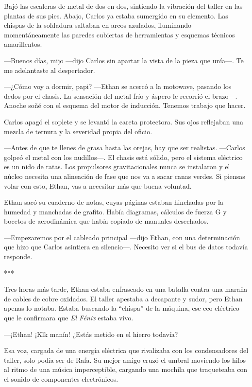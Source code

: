 \documentclass[11pt,twoside]{book}
\begin{document}
Bajó las escaleras de metal de dos en dos, sintiendo la vibración del taller en las plantas de sus pies. Abajo, Carlos ya estaba sumergido en su elemento. Las chispas de la soldadura saltaban en arcos azulados, iluminando momentáneamente las paredes cubiertas de herramientas y esquemas técnicos amarillentos.

---Buenos días, mijo ---dijo Carlos sin apartar la vista de la pieza que unía---. Te me adelantaste al despertador.

---¿Cómo voy a dormir, papi? ---Ethan se acercó a la motowave, pasando los dedos por el chasis. La sensación del metal frío y áspero le recorrió el brazo---. Anoche soñé con el esquema del motor de inducción. Tenemos trabajo que hacer.

Carlos apagó el soplete y se levantó la careta protectora. Sus ojos reflejaban una mezcla de ternura y la severidad propia del oficio.

---Antes de que te llenes de grasa hasta las orejas, hay que ser realistas. ---Carlos golpeó el metal con los nudillos---. El chasis está sólido, pero el sistema eléctrico es un nido de ratas. Los propulsores gravitacionales nunca se instalaron y el núcleo necesita una alineación de fase que nos va a sacar canas verdes. Si piensas volar con esto, Ethan, vas a necesitar más que buena voluntad.

Ethan sacó su cuaderno de notas, cuyas páginas estaban hinchadas por la humedad y manchadas de grafito. Había diagramas, cálculos de fuerza G y bocetos de aerodinámica que había copiado de manuales desechados.

---Empezaremos por el cableado principal ---dijo Ethan, con una determinación que hizo que Carlos asintiera en silencio---. Necesito ver si el bus de datos todavía responde.

\bigskip
\begin{center}***\end{center}
\bigskip

Tres horas más tarde, Ethan estaba enfrascado en una batalla contra una maraña de cables de cobre oxidados. El taller apestaba a decapante y sudor, pero Ethan apenas lo notaba. Estaba buscando la ``chispa'' de la máquina, ese eco eléctrico que le confirmara que \textit{El Fénix} estaba vivo.

---¡Ethan! ¡Klk manín! ¿Estás metido en el hierro todavía?

Esa voz, cargada de una energía eléctrica que rivalizaba con los condensadores del taller, solo podía ser de Rafa. Su mejor amigo cruzó el umbral moviendo los hilos al ritmo de una música imperceptible, cargando una mochila que traqueteaba con el sonido de componentes electrónicos.
\end{document}
